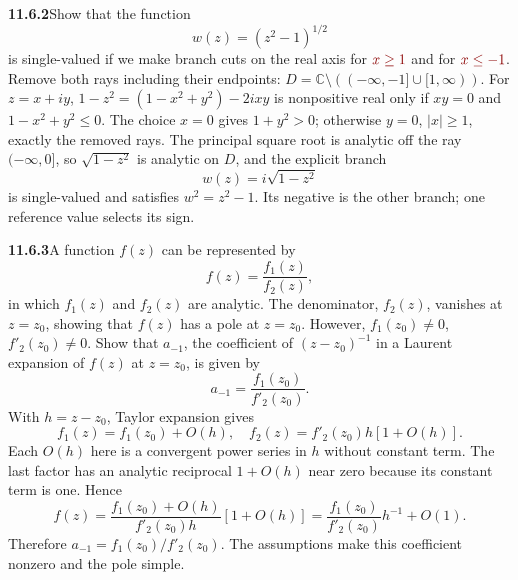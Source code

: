 \par\bigskip
\noindent\textbf{11.6.2}\quad Show that the function
\[
w(z)=(z^{2}-1)^{1/2}
\]
is single-valued if we make branch cuts on the real axis for $\erratum{x\ge1}$ and for $\erratum{x\le-1}$.
\solution
Remove both rays including their endpoints:
$D=\mathbb C\setminus((-\infty,-1]\cup[1,\infty))$.
For $z=x+iy$, $1-z^2=(1-x^2+y^2)-2ixy$ is nonpositive real only if
$xy=0$ and $1-x^2+y^2\le0$. The choice $x=0$ gives $1+y^2>0$;
otherwise $y=0$, $|x|\ge1$, exactly the removed rays.
The principal square root is analytic off the ray $(-\infty,0]$, so
$\sqrt{1-z^2}$ is analytic on $D$, and the explicit branch
\[
\boxed{w(z)=i\sqrt{1-z^2}}
\]
is single-valued and satisfies $w^2=z^2-1$.
Its negative is the other branch; one reference value selects its sign.

\par\bigskip
\noindent\textbf{11.6.3}\quad A function $f(z)$ can be represented by
\[
f(z)=\frac{f_{1}(z)}{f_{2}(z)},
\]
in which $f_{1}(z)$ and $f_{2}(z)$ are analytic. The denominator, $f_{2}(z)$,
vanishes at $z=z_{0}$, showing that $f(z)$ has a pole at $z=z_{0}$. However,
$f_{1}(z_{0})\neq0$, $f'_{2}(z_{0})\neq0$. Show that $a_{-1}$, the coefficient
of $(z-z_{0})^{-1}$ in a Laurent expansion of $f(z)$ at $z=z_{0}$, is given by
\[
a_{-1}=\frac{f_{1}(z_{0})}{f'_{2}(z_{0})}.
\]
\solution
With $h=z-z_0$, Taylor expansion gives
\[
f_1(z)=f_1(z_0)+O(h),\quad
f_2(z)=f'_2(z_0)h[1+O(h)].
\]
Each $O(h)$ here is a convergent power series in $h$ without constant
term. The last factor has an analytic reciprocal $1+O(h)$ near zero
because its constant term is one. Hence
\[
f(z)=\frac{f_1(z_0)+O(h)}{f'_2(z_0)h}[1+O(h)]
=\frac{f_1(z_0)}{f'_2(z_0)}h^{-1}+O(1).
\]
Therefore $\boxed{a_{-1}=f_1(z_0)/f'_2(z_0)}$.
The assumptions make this coefficient nonzero and the pole simple.

